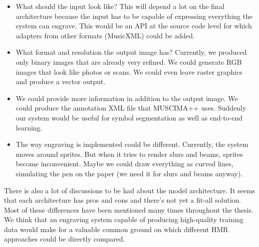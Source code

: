 \begin{itemize}
    \item What should the input look like? This will depend a lot on the final architecture because the input has to be capable of expressing everything the system can engrave. This would be an API at the source code level for which adapters from other formats (MusicXML) could be added.

    \item What format and resolution the output image has? Currently, we produced only binary images that are already very refined. We could generate RGB images that look like photos or scans. We could even leave raster graphics and produce a vector output.

    \item We could provide more information in addition to the output image. We could produce the annotation XML file that MUSCIMA++ uses. Suddenly our system would be useful for symbol segmentation as well as end-to-end learning.

    \item The way engraving is implemented could be different. Currently, the system moves around sprites. But when it tries to render slurs and beams, sprites become inconvenient. Maybe we could draw everything as curved lines, simulating the pen on the paper (we need it for slurs and beams anyway).
\end{itemize}

There is also a lot of discussions to be had about the model architecture. It seems that each architecture has pros and cons and there's not yet a fit-all solution. Most of these differences have been mentioned many times throughout the thesis. We think that an engraving system capable of producing high-quality training data would make for a valuable common ground on which different HMR approaches could be directly compared.
